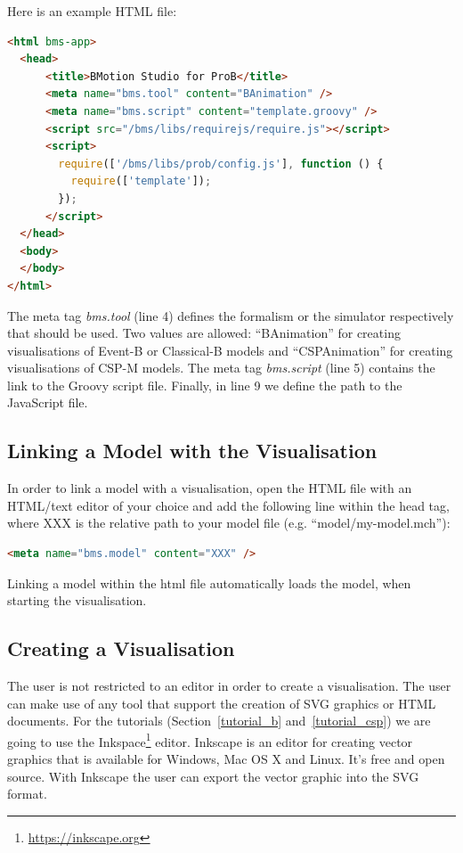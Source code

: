 \documentclass[twoside,10pt]{book}
\begin{document}
Here is an example HTML file:

\begin{lstlisting}[language=html]
<html bms-app>
  <head>
      <title>BMotion Studio for ProB</title>
      <meta name="bms.tool" content="BAnimation" />
      <meta name="bms.script" content="template.groovy" />
      <script src="/bms/libs/requirejs/require.js"></script>
      <script>
        require(['/bms/libs/prob/config.js'], function () {
          require(['template']);
        });
      </script>
  </head>
  <body>
  </body>
</html>
\end{lstlisting}

The meta tag \textit{bms.tool} (line 4) defines the formalism or the simulator respectively that should be used. 
Two values are allowed: ``BAnimation'' for creating visualisations of Event-B or Classical-B models and ``CSPAnimation'' for creating visualisations of CSP-M models.
The meta tag \textit{bms.script} (line 5) contains the link to the Groovy script file.
Finally, in line 9 we define the path to the JavaScript file.

\subsection{Linking a Model with the Visualisation}

In order to link a model with a visualisation, open the HTML file with an HTML/text editor of your choice and add the following line within the head tag, where XXX is the relative path to your model file (e.g. ``model/my-model.mch''):

\begin{lstlisting}[language=html]
<meta name="bms.model" content="XXX" />
\end{lstlisting}

Linking a model within the html file automatically loads the model, when starting the visualisation.

\subsection{Creating a Visualisation}
\label{create_vis}

The user is not restricted to an editor in order to create a visualisation.
The user can make use of any tool that support the creation of SVG graphics or HTML documents.
For the tutorials (Section~\ref{tutorial_b} and~\ref{tutorial_csp}) we are going to use the Inkspace\footnote{\url{https://inkscape.org}} editor. Inkscape is an editor for creating vector graphics that is available for Windows, Mac OS X and Linux.
It's free and open source.
With Inkscape the user can export the vector graphic into the SVG format.
\end{document}

